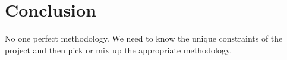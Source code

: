 \section{Conclusion}
No one perfect methodology.
We need to know the unique constraints of the project and then pick or mix up the appropriate methodology.
